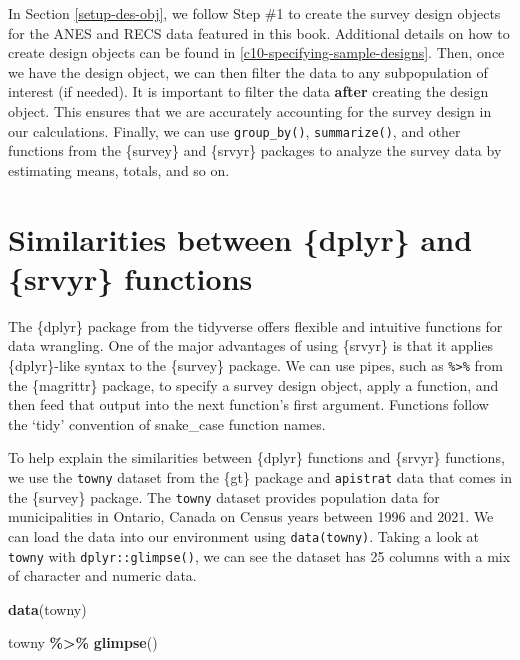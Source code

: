 \documentclass[
]{krantz}
\makeatletter
\newenvironment{Shaded}{\begin{snugshade}}{\end{snugshade}}
\newcommand{\FunctionTok}[1]{\textcolor[rgb]{0.27,0.27,0.27}{\textbf{#1}}}
\newcommand{\NormalTok}[1]{#1}
\newcommand{\SpecialCharTok}[1]{\textcolor[rgb]{0.43,0.43,0.43}{\textbf{#1}}}
\newenvironment{kframe}{%
\medskip{}
\setlength{\fboxsep}{.8em}
 \def\at@end@of@kframe{}%
 \ifinner\ifhmode%
  \def\at@end@of@kframe{\end{minipage}}%
  \begin{minipage}{\columnwidth}%
 \fi\fi%
 \def\FrameCommand##1{\hskip\@totalleftmargin \hskip-\fboxsep
 \colorbox{shadecolor}{##1}\hskip-\fboxsep
     \hskip-\linewidth \hskip-\@totalleftmargin \hskip\columnwidth}%
 \MakeFramed {\advance\hsize-\width
   \@totalleftmargin\z@ \linewidth\hsize
   \@setminipage}}%
 {\par\unskip\endMakeFramed%
 \at@end@of@kframe}
\renewenvironment{Shaded}{\begin{kframe}}{\end{kframe}}
\makeatother
\begin{document}
In Section \ref{setup-des-obj}, we follow Step \#1 to create the survey design objects for the ANES and RECS data featured in this book. Additional details on how to create design objects can be found in \ref{c10-specifying-sample-designs}. Then, once we have the design object, we can then filter the data to any subpopulation of interest (if needed). It is important to filter the data \textbf{after} creating the design object. This ensures that we are accurately accounting for the survey design in our calculations. Finally, we can use \texttt{group\_by()}, \texttt{summarize()}, and other functions from the \{survey\} and \{srvyr\} packages to analyze the survey data by estimating means, totals, and so on.

\hypertarget{similarities-dplyr-srvyr}{%
\section{Similarities between \{dplyr\} and \{srvyr\} functions}\label{similarities-dplyr-srvyr}}

The \{dplyr\} package from the tidyverse offers flexible and intuitive functions for data wrangling. One of the major advantages of using \{srvyr\} is that it applies \{dplyr\}-like syntax to the \{survey\} package. We can use pipes, such as \texttt{\%\textgreater{}\%} from the \{magrittr\} package, to specify a survey design object, apply a function, and then feed that output into the next function's first argument. Functions follow the `tidy' convention of snake\_case function names.

To help explain the similarities between \{dplyr\} functions and \{srvyr\} functions, we use the \texttt{towny} dataset from the \{gt\} package and \texttt{apistrat} data that comes in the \{survey\} package. The \texttt{towny} dataset provides population data for municipalities in Ontario, Canada on Census years between 1996 and 2021. We can load the data into our environment using \texttt{data(towny)}. Taking a look at \texttt{towny} with \texttt{dplyr::glimpse()}, we can see the dataset has 25 columns with a mix of character and numeric data.

\begin{Shaded}
\begin{Highlighting}[]
\FunctionTok{data}\NormalTok{(towny)}

\NormalTok{towny }\SpecialCharTok{\%\textgreater{}\%}
  \FunctionTok{glimpse}\NormalTok{()}
\end{Highlighting}
\end{Shaded}
\end{document}
